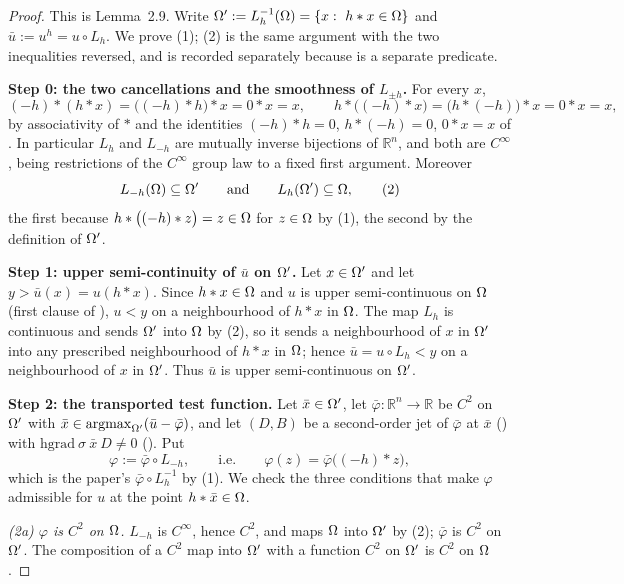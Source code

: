 \begin{proof}
This is Lemma~2.9. Write $\Omega':=L_h^{-1}(\Omega)=\{x:\ h*x\in\Omega\}$ and
$\bar u:=u^{h}=u\circ L_h$. We prove (1); (2) is the same argument with the two
inequalities reversed, and is recorded separately because  is a
separate predicate.

\medskip\noindent\textbf{Step 0: the two cancellations and the smoothness of $L_{\pm h}$.}
For every $x$,
\[
 (-h)*(h*x)=\big((-h)*h\big)*x=0*x=x,\qquad
 h*\big((-h)*x\big)=\big(h*(-h)\big)*x=0*x=x, \tag{1}
\]
by associativity of $*$ and the identities $(-h)*h=0$, $h*(-h)=0$, $0*x=x$ of
. In particular $L_h$ and $L_{-h}$ are mutually inverse bijections of
$\mathbb R^{n}$, and both are $C^{\infty}$, being restrictions of the $C^{\infty}$ group law
to a fixed first argument. Moreover
\[
 L_{-h}(\Omega)\subseteq\Omega'\qquad\text{and}\qquad L_h(\Omega')\subseteq\Omega , \tag{2}
\]
the first because $h*\big((-h)*z\big)=z\in\Omega$ for $z\in\Omega$ by (1), the second by the
definition of $\Omega'$.

\medskip\noindent\textbf{Step 1: upper semi-continuity of $\bar u$ on $\Omega'$.} Let
$x\in\Omega'$ and let $y>\bar u(x)=u(h*x)$. Since $h*x\in\Omega$ and $u$ is upper semi-continuous
on $\Omega$ (first clause of ), $u<y$ on a neighbourhood of $h*x$ in
$\Omega$. The map $L_h$ is continuous and sends $\Omega'$ into $\Omega$ by (2), so it sends a
neighbourhood of $x$ in $\Omega'$ into any prescribed neighbourhood of $h*x$ in $\Omega$; hence
$\bar u=u\circ L_h<y$ on a neighbourhood of $x$ in $\Omega'$. Thus $\bar u$ is upper
semi-continuous on $\Omega'$.

\medskip\noindent\textbf{Step 2: the transported test function.} Let $\bar x\in\Omega'$, let
$\bar\varphi:\mathbb R^{n}\to\mathbb R$ be $C^{2}$ on $\Omega'$ with
$\bar x\in\operatorname*{argmax}_{\Omega'}(\bar u-\bar\varphi)$, and let $(D,B)$ be a second-order jet of
$\bar\varphi$ at $\bar x$ () with
$\mathrm{hgrad}\ \sigma\ \bar x\ D\ne0$ (). Put
\[
 \varphi:=\bar\varphi\circ L_{-h},\qquad\text{i.e.}\qquad \varphi(z)=\bar\varphi\big((-h)*z\big),
\]
which is the paper's $\bar\varphi\circ L_h^{-1}$ by (1). We check the three conditions that
make $\varphi$ admissible for $u$ at the point $h*\bar x\in\Omega$.

\emph{(2a) $\varphi$ is $C^{2}$ on $\Omega$.} $L_{-h}$ is $C^{\infty}$, hence $C^{2}$, and maps
$\Omega$ into $\Omega'$ by (2); $\bar\varphi$ is $C^{2}$ on $\Omega'$. The composition of a $C^{2}$
map into $\Omega'$ with a function $C^{2}$ on $\Omega'$ is $C^{2}$ on $\Omega$.


\end{proof}
